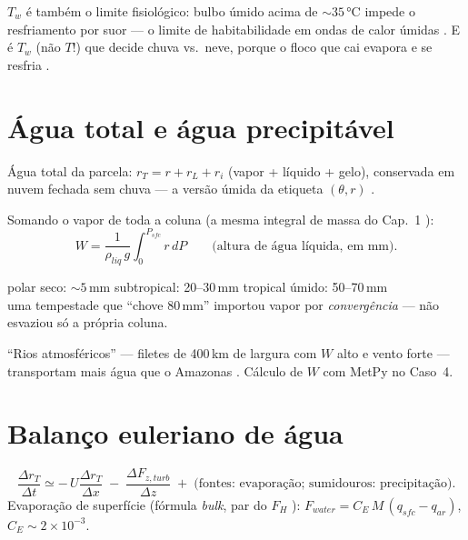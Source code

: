 \documentclass[11pt]{article}
\begin{document}
$T_w$ é também o limite fisiológico: bulbo úmido acima de $\sim 35\,°$C
impede o resfriamento por suor — o limite de habitabilidade em ondas de
calor úmidas . E é $T_w$ (não $T$!) que
decide chuva vs.\ neve, porque o floco que cai evapora e se resfria
.

\section{Água total e água precipitável}\label{sec:total}

Água total da parcela: $r_T = r + r_L + r_i$ (vapor + líquido + gelo),
conservada em nuvem fechada sem chuva — a versão úmida da etiqueta
$(\theta, r)$ .

\begin{formadif}
Somando o vapor de toda a coluna (a mesma integral de massa do Cap.~1
):
\[ W = \frac{1}{\rho_{liq}\,g}\int_{0}^{P_{sfc}} r\,dP
\qquad \text{(altura de água líquida, em mm).} \]
\end{formadif}

\begin{noquadro}
polar seco: $\sim5$\,mm \quad subtropical: 20--30\,mm \quad tropical
úmido: 50--70\,mm\\[2pt]
uma tempestade que ``chove 80\,mm'' importou vapor por
\emph{convergência} — não esvaziou só a própria coluna.
\end{noquadro}

``Rios atmosféricos'' — filetes de 400\,km de largura com $W$ alto e vento
forte — transportam mais água que o Amazonas
. Cálculo de $W$ com MetPy no Caso~4.

\section{Balanço euleriano de água}\label{sec:balanco}


\begin{formalivro}
\[ \frac{\Delta r_T}{\Delta t} \simeq
 -\,U\frac{\Delta r_T}{\Delta x}
 \;-\;\frac{\Delta F_{z,turb}}{\Delta z}
 \;+\;\text{(fontes: evaporação; sumidouros: precipitação)}. \]
Evaporação de superfície (fórmula \emph{bulk}, par do $F_H$
):
$F_{water} = C_E\,M\,(q_{sfc} - q_{ar})$, $C_E \sim 2\times10^{-3}$.
\end{formalivro}
\end{document}

